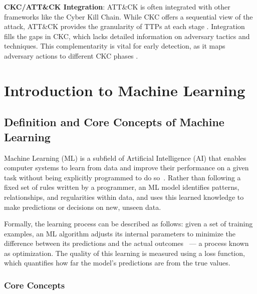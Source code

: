 \textbf{CKC/ATT\&CK Integration}: ATT\&CK is often integrated with other frameworks like the Cyber Kill Chain. While CKC offers a sequential view of the attack, ATT\&CK provides the granularity of TTPs at each stage \cite{jiang2025mitre}. Integration fills the gaps in CKC, which lacks detailed information on adversary tactics and techniques. This complementarity is vital for early detection, as it maps adversary actions to different CKC phases \cite{jiang2025mitre}.


\section{Introduction to Machine Learning}

\subsection{Definition and Core Concepts of Machine Learning}

Machine Learning (ML) is a subfield of Artificial Intelligence (AI) that enables computer systems to learn from data and improve their performance on a given task without being explicitly programmed to do so~\cite{bishop2006pattern}. Rather than following a fixed set of rules written by a programmer, an ML model identifies patterns, relationships, and regularities within data, and uses this learned knowledge to make predictions or decisions on new, unseen data.

Formally, the learning process can be described as follows: given a set of training examples, an ML algorithm adjusts its internal parameters to minimize the difference between its predictions and the actual outcomes~\cite{bishop2006pattern} --- a process known as optimization. The quality of this learning is measured using a loss function, which quantifies how far the model's predictions are from the true values.



\subsubsection*{Core Concepts}

